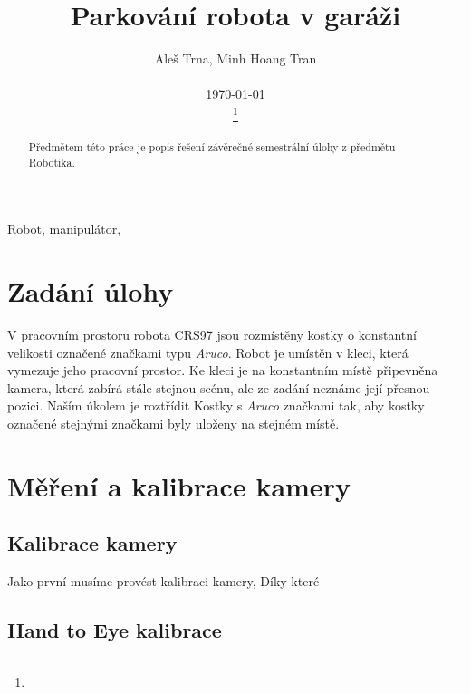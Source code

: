 \documentclass[journal,twoside,web]{ieeecolor}
\begin{document}
\title{Parkování robota v garáži}
\author{Aleš Trna, Minh Hoang Tran \\ \begin{center}
    \today
\end{center}
\thanks{}}

\maketitle

\begin{abstract}
    Předmětem této práce je popis řešení závěrečné semestrální úlohy z předmětu Robotika.
\end{abstract}

\begin{IEEEkeywords}
    Robot, manipulátor, 
    \end{IEEEkeywords}

\section{Zadání úlohy}
    V pracovním prostoru robota CRS97 jsou rozmístěny kostky o konstantní velikosti označené značkami typu \textit{Aruco}.
    Robot je umístěn v kleci, která vymezuje jeho pracovní prostor. Ke kleci je na konstantním místě připevněna kamera, která zabírá
    stále stejnou scénu, ale ze zadání neznáme její přesnou pozici. Naším úkolem je roztřídit Kostky s \textit{Aruco} značkami tak, aby
    kostky označené stejnými značkami byly uloženy na stejném místě.

\section{Měření a kalibrace kamery}
\subsection{Kalibrace kamery}
    Jako první musíme provést kalibraci kamery, Díky které 
\subsection{Hand to Eye kalibrace}
\end{document}
